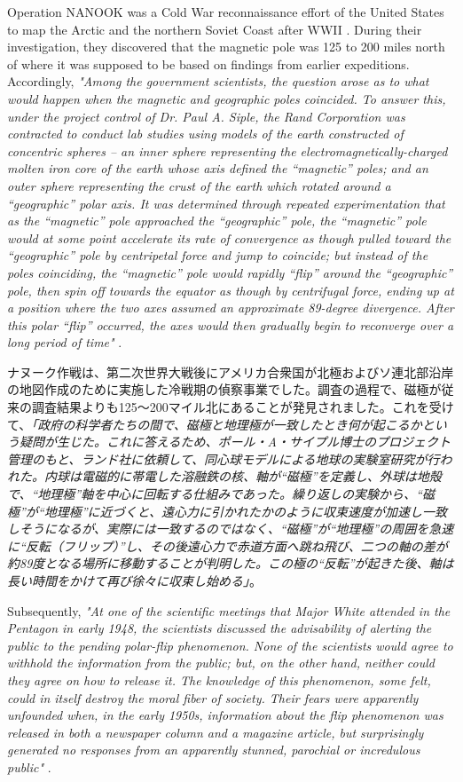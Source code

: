 \documentclass[10pt,twocolumn,letterpaper]{article}
\begin{document}
Operation NANOOK was a Cold War reconnaissance effort of the United States to map the Arctic and the northern Soviet Coast after WWII \cite{137}. During their investigation, they discovered that the magnetic pole was 125 to 200 miles north of where it was supposed to be based on findings from earlier expeditions. Accordingly, \textit{"Among the government scientists, the question arose as to what would happen when the magnetic and geographic poles coincided. To answer this, under the project control of Dr. Paul A. Siple, the Rand Corporation was contracted to conduct lab studies using models of the earth constructed of concentric spheres – an inner sphere representing the electromagnetically-charged molten iron core of the earth whose axis defined the “magnetic” poles; and an outer sphere representing the crust of the earth which rotated around a “geographic” polar axis. It was determined through repeated experimentation that as the “magnetic” pole approached the “geographic” pole, the “magnetic” pole would at some point accelerate its rate of convergence as though pulled toward the “geographic” pole by centripetal force and jump to coincide; but instead of the poles coinciding, the “magnetic” pole would rapidly “flip” around the “geographic” pole, then spin off towards the equator as though by centrifugal force, ending up at a position where the two axes assumed an approximate 89-degree divergence. After this polar “flip” occurred, the axes would then gradually begin to reconverge over a long period of time"} \cite{138,139}.

ナヌーク作戦は、第二次世界大戦後にアメリカ合衆国が北極およびソ連北部沿岸の地図作成のために実施した冷戦期の偵察事業でした\cite{137}。調査の過程で、磁極が従来の調査結果よりも125〜200マイル北にあることが発見されました。これを受けて、\textit{「政府の科学者たちの間で、磁極と地理極が一致したとき何が起こるかという疑問が生じた。これに答えるため、ポール・A・サイプル博士のプロジェクト管理のもと、ランド社に依頼して、同心球モデルによる地球の実験室研究が行われた。内球は電磁的に帯電した溶融鉄の核、軸が“磁極”を定義し、外球は地殻で、“地理極”軸を中心に回転する仕組みであった。繰り返しの実験から、“磁極”が“地理極”に近づくと、遠心力に引かれたかのように収束速度が加速し一致しそうになるが、実際には一致するのではなく、“磁極”が“地理極”の周囲を急速に“反転（フリップ）”し、その後遠心力で赤道方面へ跳ね飛び、二つの軸の差が約89度となる場所に移動することが判明した。この極の“反転”が起きた後、軸は長い時間をかけて再び徐々に収束し始める」}\cite{138,139}。

Subsequently, \textit{"At one of the scientific meetings that Major White attended in the Pentagon in early 1948, the scientists discussed the advisability of alerting the public to the pending polar-flip phenomenon. None of the scientists would agree to withhold the information from the public; but, on the other hand, neither could they agree on how to release it. The knowledge of this phenomenon, some felt, could in itself destroy the moral fiber of society. Their fears were apparently unfounded when, in the early 1950s, information about the flip phenomenon was released in both a newspaper column and a magazine article, but surprisingly generated no responses from an apparently stunned, parochial or incredulous public"} \cite{138,139}.
\end{document}
